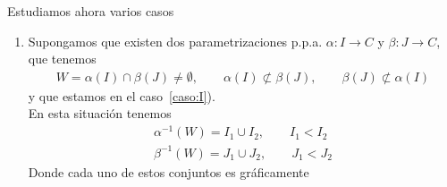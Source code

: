 \begin{observacion}
\begin{enumerate}
\begin{enumerate}[label=\Roman*), ref=\Roman*, start=2]
\begin{figure}[H]
\begin{subfigure}[b]{0.30\textwidth}
                \end{subfigure}%
                \hspace{0.2cm}%
                \begin{subfigure}[b]{0.30\textwidth}
                    \centering
                \end{subfigure}
            \end{figure}
        \end{enumerate}
    \end{enumerate}
    Estudiamos ahora varios casos
    \begin{enumerate}
        \item Supongamos que existen dos parametrizaciones p.p.a. $\alpha:I\to C$ y $\beta:J \to C$, que tenemos 
        \begin{gather*}
            W = \alpha(I) \cap \beta(J) \neq \emptyset, \qquad \alpha(I)\not\subset \beta(J),\qquad \beta(J)\not\subset \alpha(I)
        \end{gather*}
        y que estamos en el caso~\ref{caso:I}).\\

        En esta situación tenemos 
        \begin{gather*}
            \alpha^{-1}(W) = I_1 \cup I_2, \qquad I_1 < I_2\\
            \beta^{-1}(W) = J_1 \cup J_2,\qquad J_1 < J_2
        \end{gather*}
        Donde cada uno de estos conjuntos es gráficamente
        \begin{figure}[H]
            \centering
            \begin{subfigure}[c]{0.30\textwidth}
                \centering
\end{subfigure}
\end{figure}
\end{enumerate}
\end{observacion}

